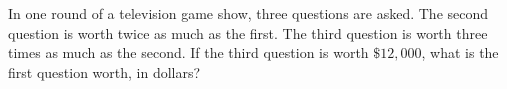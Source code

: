 In one round of a television game show, three questions are asked. The second question is worth twice as much as the first. The third question is worth three times as much as the second. If the third question is worth $\$12{,}000$, what is the first question worth, in dollars?
